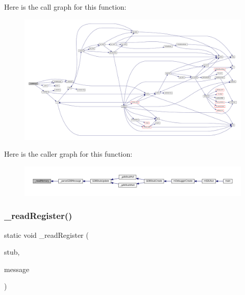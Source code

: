 Here is the call graph for this function\+:
\nopagebreak
\begin{figure}[H]
\begin{center}
\leavevmode
\includegraphics[width=350pt]{gdb-stub_8c_aaf71acf340ddecdd40415bcd393b31cb_cgraph}
\end{center}
\end{figure}
Here is the caller graph for this function\+:
\nopagebreak
\begin{figure}[H]
\begin{center}
\leavevmode
\includegraphics[width=350pt]{gdb-stub_8c_aaf71acf340ddecdd40415bcd393b31cb_icgraph}
\end{center}
\end{figure}
\mbox{\label{gdb-stub_8c_ab3eabf8dd23cecb74255396e87e72453}} 
\subsubsection{\texorpdfstring{\+\_\+read\+Register()}{\_readRegister()}}
{\footnotesize\ttfamily static void \+\_\+read\+Register (\begin{DoxyParamCaption}\item[{struct G\+D\+B\+Stub $\ast$}]{stub,  }\item[{const char $\ast$}]{message }\end{DoxyParamCaption})\hspace{0.3cm}{\ttfamily [static]}}

